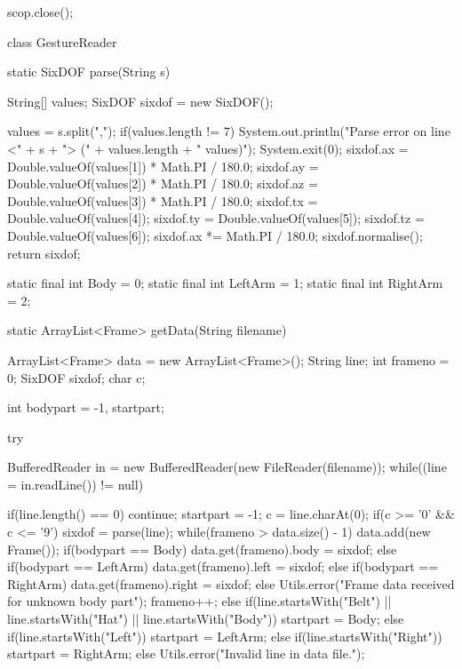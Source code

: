 \documentclass[12pt,a4,notitlepage]{report}
\renewcommand{\_}{\texttt{\symbol{95}}}
\newcommand{\<}{\texttt{\symbol{60}}}
\renewcommand{\>}{\texttt{\symbol{62}}}
\begin{document}
\begin{code}
{{      scop.close();
   }
}

class GestureReader
{
   static SixDOF parse(String s)
   {
      String[] values;
      SixDOF sixdof = new SixDOF();
      
      values = s.split(",");
      if(values.length != 7)
      {
         System.out.println("Parse error on line <" + s + "> (" +
               values.length + " values)");
         System.exit(0);
      }
      sixdof.ax = Double.valueOf(values[1]) * Math.PI / 180.0;
      sixdof.ay = Double.valueOf(values[2]) * Math.PI / 180.0;
      sixdof.az = Double.valueOf(values[3]) * Math.PI / 180.0;
      sixdof.tx = Double.valueOf(values[4]);
      sixdof.ty = Double.valueOf(values[5]);
      sixdof.tz = Double.valueOf(values[6]);
      sixdof.ax *= Math.PI / 180.0;
      sixdof.normalise();
      return sixdof;
   }
   
   static final int Body = 0;
   static final int LeftArm = 1;
   static final int RightArm = 2;
   
   static ArrayList<Frame> getData(String filename)
   {
      ArrayList<Frame> data = new ArrayList<Frame>();
      String line;
      int frameno = 0;
      SixDOF sixdof;
      char c;
      
      int bodypart = -1, startpart;
      
      try
      {
         BufferedReader in = new BufferedReader(new FileReader(filename));
         while((line = in.readLine()) != null)
         {
            if(line.length() == 0)
               continue;
            startpart = -1;
            c = line.charAt(0);
            if(c >= '0' && c <= '9')
            {
               sixdof = parse(line);
               while(frameno > data.size() - 1)
                  data.add(new Frame());
               if(bodypart == Body)
                  data.get(frameno).body = sixdof;
               else if(bodypart == LeftArm)
                  data.get(frameno).left = sixdof;
               else if(bodypart == RightArm)
                  data.get(frameno).right = sixdof;
               else
                  Utils.error("Frame data received for unknown body part");
               frameno++;
            }
            else if(line.startsWith("Belt") || line.startsWith("Hat") ||
                  line.startsWith("Body"))
               startpart = Body;
            else if(line.startsWith("Left"))
               startpart = LeftArm;
            else if(line.startsWith("Right"))
               startpart = RightArm;
            else
               Utils.error("Invalid line in data file.");
            
}}}}
\end{code}
\end{document}
